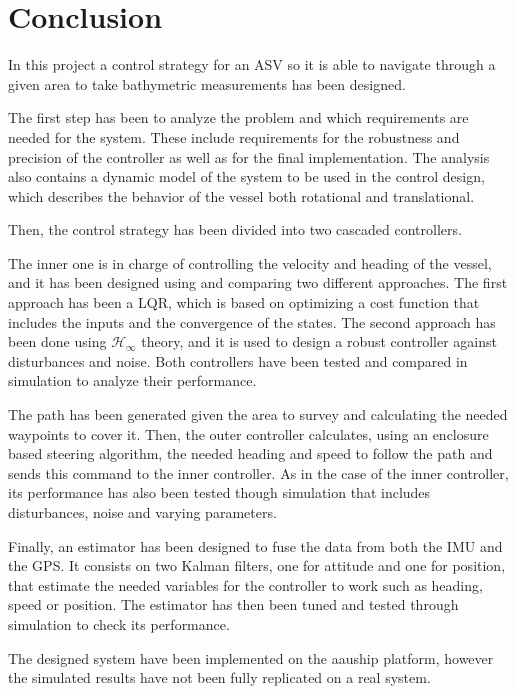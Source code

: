 \chapter{Conclusion}\label{chap:conclusion}

In this project a control strategy for an ASV so it is able to navigate through a given area to take bathymetric measurements has been designed.

The first step has been to analyze the problem and which requirements are needed for the system. These include requirements for the robustness and precision of the controller as well as for the final implementation. The analysis also contains a dynamic model of the system to be used in the control design, which describes the behavior of the vessel both rotational and translational.

Then, the control strategy has been divided into two cascaded controllers. 

The inner one is in charge of controlling the velocity and heading of the vessel, and it has been designed using and comparing two different approaches. The first approach has been a LQR, which is based on optimizing a cost function that includes the inputs and the convergence of the states. The second approach has been done using $\mathcal{H}_\infty$ theory, and it is used to design a robust controller against disturbances and noise. Both controllers have been tested and compared in simulation to analyze their performance.

The path has been generated given the area to survey and calculating the needed waypoints to cover it. Then, the outer controller calculates, using an enclosure based steering algorithm, the needed heading and speed to follow the path and sends this command to the inner controller. As in the case of the inner controller, its performance has also been tested though simulation that includes disturbances, noise and varying parameters.

Finally, an estimator has been designed to fuse the data from both the IMU and the GPS. It consists on two Kalman filters, one for attitude and one for position, that estimate the needed variables for the controller to work such as heading, speed or position. The estimator has then been tuned and tested through simulation to check its performance.

The designed system have been implemented on the aauship platform, however the simulated results have not been fully replicated on a real system.


